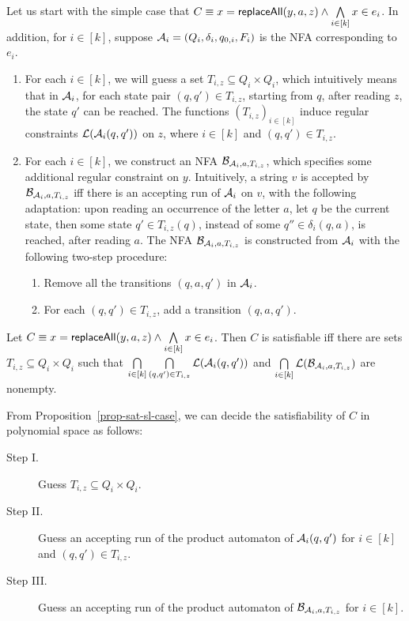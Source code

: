 Let us start with the simple case that $C \equiv x = \mathsf{replaceAll}(y, a, z) \wedge \bigwedge \limits_{i \in [k]} x \in e_{i}$.  In addition, for $i \in [k]$, suppose $\mathcal{A}_i = (Q_i, \delta_i, q_{0, i}, F_i)$ 
is the NFA corresponding to $e_i$. 
\begin{enumerate}
\item For each $i \in [k]$, we will guess a set $T_{i, z} \subseteq Q_i \times Q_i$, which intuitively means that in $\mathcal{A}_i$, for each state pair $(q, q') \in T_{i, z}$, starting from $q$, after reading $z$, the state $q' $ can be reached. The functions $(T_{i, z})_{i \in [k]}$ induce regular constraints $\mathcal{L}(\mathcal{A}_i(q,q'))$ on $z$, where $i \in [k]$ and $(q,q') \in T_{i, z}$.

\item For each $i \in [k]$, we construct an NFA $\mathcal{B}_{\mathcal{A}_i, a,  T_{i, z}}$, which specifies some additional regular constraint on $y$. Intuitively, a string $v$ is accepted by $\mathcal{B}_{\mathcal{A}_i, a,  T_{i, z}}$ iff there is an accepting run of $\mathcal{A}_i$ on $v$, with the following adaptation: upon reading an occurrence of the letter $a$, let $q$ be the current state, then some state $q' \in T_{i, z}(q)$, instead of some $q'' \in \delta_i(q,a)$, is reached, after reading $a$. The NFA $\mathcal{B}_{\mathcal{A}_i, a,  T_{i, z}}$ is constructed from $\mathcal{A}_i$ with the following two-step procedure: 
\begin{enumerate}
\item Remove all the transitions $(q, a, q')$ in $\mathcal{A}_i$.
%
\item For each $(q, q') \in T_{i, z}$, add a transition $(q, a, q')$.
\end{enumerate}
\end{enumerate}

\begin{proposition}\label{prop-sat-sl-case}
Let $C \equiv x = \mathsf{replaceAll}(y, a, z) \wedge \bigwedge \limits_{i \in [k]} x \in e_{i}$. Then $C$ is satisfiable iff there are sets $T_{i, z} \subseteq Q_i \times Q_i$ such that $\bigcap \limits_{i \in [k]} \bigcap \limits_{(q,q') \in T_{i, z}} \mathcal{L}(\mathcal{A}_{i}(q, q'))$ and $\bigcap \limits_{i \in [k]} \mathcal{L}(\mathcal{B}_{\mathcal{A}_i, a,  T_{i, z}})$ are nonempty.
\end{proposition}

From Proposition~\ref{prop-sat-sl-case}, we can decide the satisfiability of $C$ in polynomial space as follows: 
\begin{description}
\item[Step I.] Guess $T_{i,z} \subseteq Q_i \times Q_i$. 
%
\item[Step II.] Guess an accepting run of the product automaton of $\mathcal{A}_{i}(q, q')$ for $i \in [k]$ and $(q,q') \in T_{i, z}$. 
%
\item[Step III.] Guess an accepting run of the product automaton of $\mathcal{B}_{\mathcal{A}_i, a,  T_{i, z}}$ for $i \in [k]$.
\end{description}

